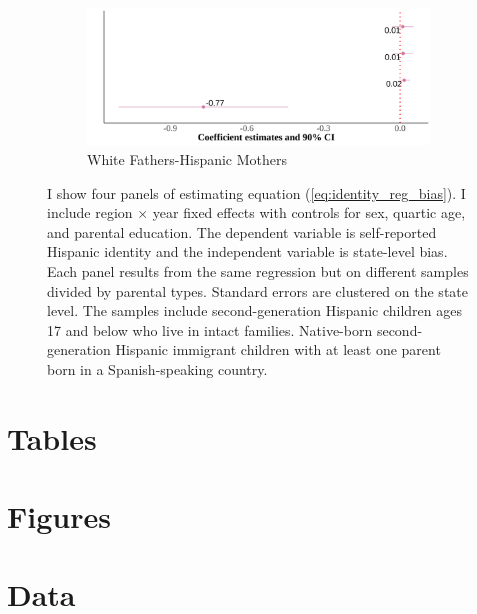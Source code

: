 \documentclass[12pt,english]{article}
\begin{document}
\begin{center}
\begin{figure}[!htb]
\begin{subfigure}{.48\textwidth}
\caption{White Fathers-Hispanic Mothers}
\centering
\includegraphics[width=.9\linewidth]{figure/by-parents-regs-wh.png}
\end{subfigure}
\caption*{\footnotesize{I show four panels of estimating equation (\ref{eq:identity_reg_bias}). I include region $\times$ year fixed effects with controls for sex, quartic age, and parental education. The dependent variable is self-reported Hispanic identity and the independent variable is state-level bias. Each panel results from the same regression but on different samples divided by parental types. Standard errors are clustered on the state level. The samples include second-generation Hispanic children ages 17 and below who live in intact families. Native-born second-generation Hispanic immigrant children with at least one parent born in a Spanish-speaking country.}}
\end{figure}
\end{center}

\pagebreak
\newpage








\pagebreak
\begingroup
{}
\setlength\bibitemsep{0pt}
\printbibliography
\endgroup
\pagebreak

\begin{appendices}

\section{Tables}\label{appendix:tabs}

% 

\section{Figures}\label{appendix:figs}



\section{Data} %
\label{sec:data-ap}


\end{appendices}
\end{document}
